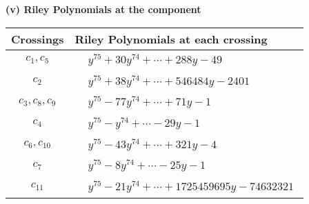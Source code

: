\documentclass[1p]{elsarticle_modified}
\theoremstyle{definition}
\begin{document}
\flushleft \textbf{(v) Riley Polynomials at the component}\newline \\
\begin{tabular}{m{50pt}|m{274pt}}
Crossings & \hspace{64pt}Riley Polynomials at each crossing \\
\hline $$\begin{aligned}c_{1},c_{5}\end{aligned}$$&$\begin{aligned}
&y^{75}+30 y^{74}+\cdots+288 y-49
\end{aligned}$\\
\hline $$\begin{aligned}c_{2}\end{aligned}$$&$\begin{aligned}
&y^{75}+38 y^{74}+\cdots+546484 y-2401
\end{aligned}$\\
\hline $$\begin{aligned}c_{3},c_{8},c_{9}\end{aligned}$$&$\begin{aligned}
&y^{75}-77 y^{74}+\cdots+71 y-1
\end{aligned}$\\
\hline $$\begin{aligned}c_{4}\end{aligned}$$&$\begin{aligned}
&y^{75}- y^{74}+\cdots-29 y-1
\end{aligned}$\\
\hline $$\begin{aligned}c_{6},c_{10}\end{aligned}$$&$\begin{aligned}
&y^{75}-43 y^{74}+\cdots+321 y-4
\end{aligned}$\\
\hline $$\begin{aligned}c_{7}\end{aligned}$$&$\begin{aligned}
&y^{75}-8 y^{74}+\cdots-25 y-1
\end{aligned}$\\
\hline $$\begin{aligned}c_{11}\end{aligned}$$&$\begin{aligned}
&y^{75}-21 y^{74}+\cdots+1725459695 y-74632321
\end{aligned}$\\
\hline
\end{tabular}\\~\\
\end{document}
